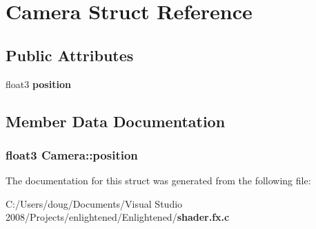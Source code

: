 \section{Camera Struct Reference}
\label{struct_camera}
\subsection*{Public Attributes}
\begin{DoxyCompactItemize}
\item 
float3 {\bf position}
\end{DoxyCompactItemize}


\subsection{Member Data Documentation}
\subsubsection[{position}]{\setlength{\rightskip}{0pt plus 5cm}float3 {\bf Camera::position}}\label{struct_camera_a2f80b5ae836afb019f838c057859db0a}


The documentation for this struct was generated from the following file:\begin{DoxyCompactItemize}
\item 
C:/Users/doug/Documents/Visual Studio 2008/Projects/enlightened/Enlightened/{\bf shader.fx.c}\end{DoxyCompactItemize}
